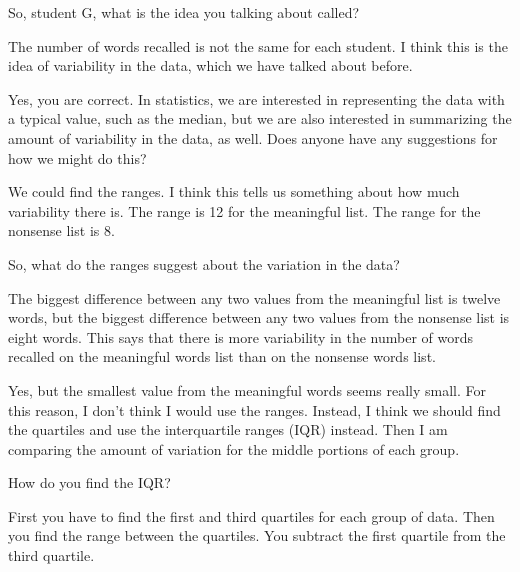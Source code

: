 {\begin{scriptlist}
      \item [Teacher:] So, student G, what is the idea you talking about called?
      
      \item [Student G:] The number of words recalled is not the same for each student. I think this is the idea of variability in the data, which we have talked about before.
      
      \item [Teacher:] Yes, you are correct. In statistics, we are interested in representing the data with a typical value, such as the median, but we are also interested in summarizing the amount of variability in the data, as well. Does anyone have any suggestions for how we might do this?
  
      \item [Student H:] We could find the ranges. I think this tells us something about how much variability there is. The range is 12 for the meaningful list. The range for the nonsense list is $8$.\vspace{\baselineskip}
      
      \item [Teacher:] So, what do the ranges suggest about the variation in the data?
      
      \item [Student H:] The biggest difference between any two values from the meaningful list is twelve words, but the biggest difference between any two values from the nonsense list is eight words. This says that there is more variability in the number of words recalled on the meaningful words list than on the nonsense words list.
      
      \item [Student I:] Yes, but the smallest value from the meaningful words seems really small. For this reason, I don't think I would use the ranges. Instead, I think we should find the quartiles and use the interquartile ranges (IQR) instead. Then I am comparing the amount of variation for the middle portions of each group.
      
      \item [Teacher:] How do you find the IQR?
      
      \item [Student I:] First you have to find the first and third quartiles for each group of data. Then you find the range between the quartiles. You subtract the first quartile from the third quartile.
      

\end{scriptlist}}
